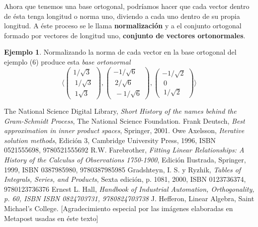 \documentclass[11pt]{article}
\theoremstyle{definition}
\newtheorem{ejemplo}[ejm]{Ejemplo}
\begin{document}
Ahora que tenemos una base ortogonal, podríamos hacer que cada vector dentro de ésta tenga longitud o norma uno, diviendo a cada uno dentro de su propia longitud. A éste proceso se le llama \textbf{normalización} y a el conjunto ortogonal formado por vectores de longitud uno, \textbf{conjunto de vectores ortonormales}.

\begin{ejemplo}
Normalizando la norma de cada vector en la base ortogonal del ejemplo (6) produce esta \emph{base ortonormal}
\[ \langle \left(\begin{array}{c} 1/\sqrt{3} \\\ 1/\sqrt{3} \\\ 1\sqrt{3} \end{array} \right),\left(\begin{array}{c} -1/\sqrt{6} \\\ 2/\sqrt{6} \\\ -1/\sqrt{6} \end{array} \right) , \left(\begin{array}{c} -1/\sqrt{2} \\\ 0 \\\ 1/\sqrt{2} \end{array} \right) \rangle\]

\end{ejemplo}


\begin{thebibliography}{99}
	 The National Science Digital Library,
	   {\it Short History of the names behind the Gram-Schmidt Process}, The National Science Foundation. %
  	 Frank Deutsch,
	   {\it Best approximation in inner product spaces},
	   Springer, 2001. %
	 Owe Axelsson, {\it Iterative solution methods}, Edición 3, Cambridge University Press, 1996, ISBN 0521555698, 9780521555692 %
	 R.W. Farebrother, {\it Fitting Linear Relationships: A History of the Calculus of Observations 1750-1900}, Edición Ilustrada, Springer, 1999, ISBN 0387985980, 9780387985985
	 Gradshteyn, I. S. y Ryzhik, {\it Tables of Integrals, Series, and Products}, Sexta edición, p. 1081, 2000, ISBN 0123736374, 9780123736376 
	 Ernest L. Hall, {\it Handbook of Industrial Automation, Orthogonality, p. 60, ISBN ISBN 0824703731, 9780824703738}
	 J. Hefferon, Linear Algebra, Saint Michael's College.
[Agradecimiento especial por las im\'{a}genes elaboradas en Metapost usadas en \'{e}ste texto]
  \end{thebibliography}
\end{document}
